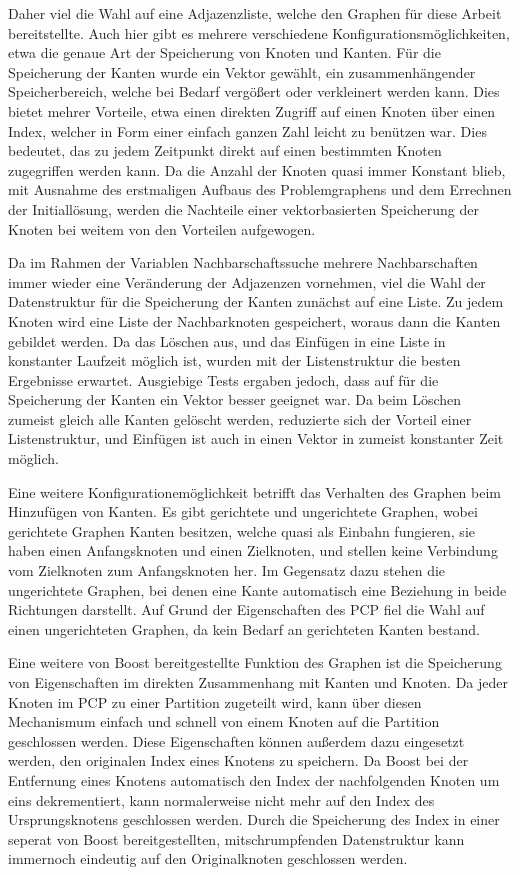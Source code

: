 Daher viel die Wahl auf eine Adjazenzliste, welche den Graphen für diese Arbeit bereitstellte. Auch hier gibt es mehrere verschiedene Konfigurationsmöglichkeiten, etwa die genaue Art der Speicherung von
Knoten und Kanten. Für die Speicherung der Kanten wurde ein Vektor gewählt, ein zusammenhängender Speicherbereich, welche bei Bedarf vergößert oder verkleinert werden kann. Dies bietet mehrer Vorteile, etwa
einen direkten Zugriff auf einen Knoten über einen Index, welcher in Form einer einfach ganzen Zahl leicht zu benützen war. Dies bedeutet, das zu jedem Zeitpunkt direkt auf einen bestimmten Knoten zugegriffen
werden kann. Da die Anzahl der Knoten quasi immer Konstant blieb, mit Ausnahme des erstmaligen Aufbaus des Problemgraphens und dem Errechnen der Initiallösung, werden die Nachteile einer vektorbasierten
Speicherung der Knoten bei weitem von den Vorteilen aufgewogen. 

Da im Rahmen der Variablen Nachbarschaftssuche mehrere Nachbarschaften immer wieder eine Veränderung der Adjazenzen vornehmen, viel die Wahl der Datenstruktur für die Speicherung der Kanten zunächst auf eine
Liste. Zu jedem Knoten wird eine Liste der Nachbarknoten gespeichert, woraus dann die Kanten gebildet werden. Da das Löschen aus, und das Einfügen in eine Liste in konstanter Laufzeit möglich ist, wurden
mit der Listenstruktur die besten Ergebnisse erwartet. Ausgiebige Tests ergaben jedoch, dass auf für die Speicherung der Kanten ein Vektor besser geeignet war. Da beim Löschen zumeist gleich alle
Kanten gelöscht werden, reduzierte sich der Vorteil einer Listenstruktur, und Einfügen ist auch in einen Vektor in zumeist konstanter Zeit möglich. 

Eine weitere Konfigurationemöglichkeit betrifft das Verhalten des Graphen beim Hinzufügen von Kanten. Es gibt gerichtete und ungerichtete Graphen, wobei gerichtete Graphen Kanten besitzen, welche quasi
als Einbahn fungieren, sie haben einen Anfangsknoten und einen Zielknoten, und stellen keine Verbindung vom Zielknoten zum Anfangsknoten her. Im Gegensatz dazu stehen die ungerichtete Graphen, bei denen
eine Kante automatisch eine Beziehung in beide Richtungen darstellt. Auf Grund der Eigenschaften des PCP fiel die Wahl auf einen ungerichteten Graphen, da kein Bedarf an gerichteten Kanten bestand.

Eine weitere von Boost bereitgestellte Funktion des Graphen ist die Speicherung von Eigenschaften im direkten Zusammenhang mit Kanten und Knoten. Da jeder Knoten im PCP zu einer Partition zugeteilt wird, kann
über diesen Mechanismum einfach und schnell von einem Knoten auf die Partition geschlossen werden. Diese Eigenschaften können außerdem dazu eingesetzt werden, den originalen Index eines Knotens zu speichern.
Da Boost bei der Entfernung eines Knotens automatisch den Index der nachfolgenden Knoten um eins dekrementiert, kann normalerweise nicht mehr auf den Index des Ursprungsknotens geschlossen werden. Durch
die Speicherung des Index in einer seperat von Boost bereitgestellten, mitschrumpfenden Datenstruktur kann immernoch eindeutig auf den Originalknoten geschlossen werden. 

